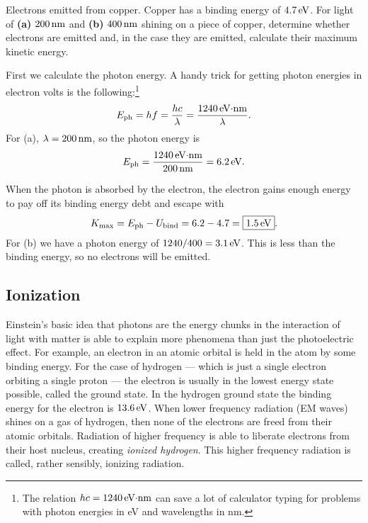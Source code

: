 \begin{example}{Electrons emitted from copper.}
Copper has a binding energy of $4.7\,\mbox{eV}$.  For light of {\bf
  (a)} $200\,\mbox{nm}$ and {\bf (b)} $400\,\mbox{nm}$ shining on a
piece of copper, determine whether electrons are emitted and, in the
case they are emitted, calculate their maximum kinetic energy.

\solution First we calculate the photon energy.  A handy trick for
getting photon energies in electron volts is the
following:\footnote{The relation $hc=1240\,\mbox{eV$\cdot$nm}$ can save
  a lot of calculator typing for problems with photon energies in eV and
  wavelengths in nm.}
%
\begin{equation}
  E_\text{ph} = hf = \frac{hc}{\lambda}
  =\frac{1240\,\mbox{eV$\cdot$nm}}{\lambda}.
\end{equation}
%
For (a), $\lambda = 200\,\mbox{nm}$, so the photon energy is
%
\begin{equation}
  E_\text{ph}= \frac{1240\,\mbox{eV$\cdot$nm}}{200\,\mbox{nm}} =
  6.2\,\mbox{eV}.
\end{equation}

When the photon is absorbed by the electron, the electron gains enough
energy to pay off its binding energy debt and escape with
\begin{equation}
  K_\text{max} = E_\text{ph} - U_\text{bind} = 6.2 - 4.7 = 
\boxed{1.5\,\mbox{eV}}.
\end{equation}
For (b) we have a photon energy of $1240/400= 3.1\,\mbox{eV}$.  This
is less than the binding energy, so no electrons will be emitted.
\end{example}

\subsection{Ionization}

Einstein's basic idea that photons are the energy chunks in the
interaction of light with matter is able to explain more phenomena
than just the photoelectric effect.  For example, an electron in an
atomic orbital is held in the atom by some binding energy.  For the
case of hydrogen --- which is just a single electron orbiting a single
proton --- the electron is usually in the lowest energy state
possible, called the ground state.  In the hydrogen ground state the
binding energy for the electron is $13.6\,\mbox{eV}$.  When lower
frequency radiation (EM waves) shines on a gas of hydrogen, then none
of the electrons are freed from their atomic orbitals.  Radiation of
higher frequency is able to liberate electrons from their host
nucleus, creating \textit{ionized hydrogen}.  This higher frequency
radiation is called, rather sensibly, ionizing radiation.

